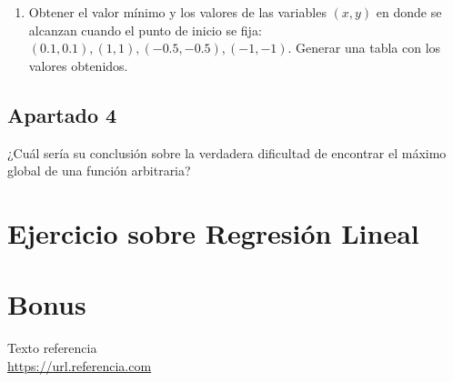 \documentclass[11pt,a4paper]{article}
\begin{document}
\begin{enumerate}[resume, label=\alph*)]
	\item Obtener el valor mínimo y los valores de las variables $(x, y)$ en donde se alcanzan cuando el punto de inicio
	se fija: $(0.1, 0.1), (1, 1), (-0.5, -0.5), (-1, -1)$. Generar una tabla con los valores obtenidos.
\end{enumerate}

\subsection*{Apartado 4}
\noindent ¿Cuál sería su conclusión sobre la verdadera dificultad de encontrar el máximo global de una función arbitraria?

\section{Ejercicio sobre Regresión Lineal}

\section{Bonus}

\newpage

\begin{thebibliography}{5}

Texto referencia
\\\url{https://url.referencia.com}

\end{thebibliography}
\end{document}
